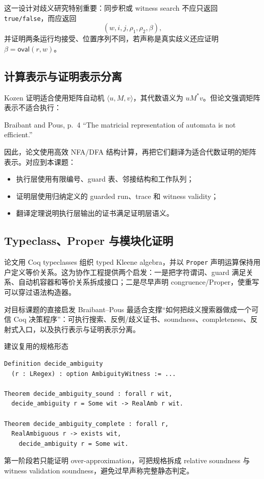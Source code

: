 \documentclass[UTF8,a4paper,12pt]{ctexart}
\newcommand{\ovalfn}{\mathsf{oval}}
\begin{document}
这一设计对歧义研究特别重要：同步积或 witness search 不应只返回 \texttt{true/false}，而应返回
\[
(w,i,j,\rho_1,\rho_2,\beta),
\]
并证明两条运行均接受、位置序列不同，若声称是真实歧义还应证明 $\beta=\ovalfn(r,w)$。

\subsection{计算表示与证明表示分离}

Kozen 证明适合使用矩阵自动机 $\langle u,M,v\rangle$，其代数语义为 $uM^*v$。但论文强调矩阵表示不适合执行：
\begin{paperquote}{Braibant and Pous, p.~4}
``The matricial representation of automata is not efficient.''
\end{paperquote}
因此，论文使用高效 NFA/DFA 结构计算，再把它们翻译为适合代数证明的矩阵表示。对应到本课题：
\begin{itemize}
  \item 执行层使用有限编号、guard 表、邻接结构和工作队列；
  \item 证明层使用归纳定义的 guarded run、trace 和 witness validity；
  \item 翻译定理说明执行层输出的证书满足证明层语义。
\end{itemize}

\subsection{Typeclass、Proper 与模块化证明}

论文用 Coq typeclasses 组织 typed Kleene algebra，并以 \texttt{Proper} 声明运算保持用户定义等价关系。这为协作工程提供两个启发：一是把字符谓词、guard 满足关系、自动机容器和等价关系拆成接口；二是尽早声明 congruence/Proper，使重写可以穿过语法构造器。

\begin{directlink}{对目标课题的直接启发}
Braibant--Pous 最适合支撑“如何把歧义搜索器做成一个可信 Coq 决策程序”：可执行搜索、反例/歧义证书、soundness、completeness、反射式入口，以及执行表示与证明表示分离。
\end{directlink}

\begin{coqbox}{建议复用的规格形态}
\begin{lstlisting}
Definition decide_ambiguity
  (r : LRegex) : option AmbiguityWitness := ...

Theorem decide_ambiguity_sound : forall r wit,
  decide_ambiguity r = Some wit -> RealAmb r wit.

Theorem decide_ambiguity_complete : forall r,
  RealAmbiguous r -> exists wit,
    decide_ambiguity r = Some wit.
\end{lstlisting}
第一阶段若只能证明 over-approximation，可把规格拆成 relative soundness 与 witness validation soundness，避免过早声称完整静态判定。
\end{coqbox}
\end{document}

